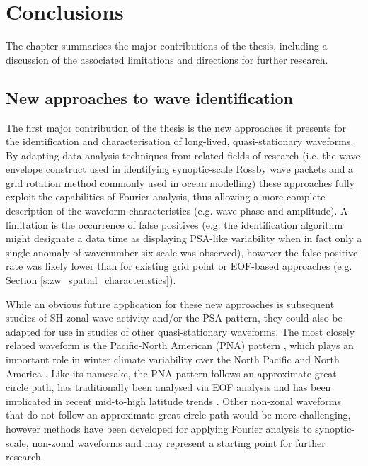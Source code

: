 
\chapter{Conclusions}


\begin{synopsis}

The chapter summarises the major contributions of the thesis, including a discussion of the associated limitations and directions for further research.

\end{synopsis}


\section{New approaches to wave identification}

The first major contribution of the thesis is the new approaches it presents for the identification and characterisation of long-lived, quasi-stationary waveforms. By adapting data analysis techniques from related fields of research (i.e. the wave envelope construct used in identifying synoptic-scale Rossby wave packets and a grid rotation method commonly used in ocean modelling) these approaches fully exploit the capabilities of Fourier analysis, thus allowing a more complete description of the waveform characteristics (e.g. wave phase and amplitude). A limitation is the occurrence of false positives (e.g. the identification algorithm might designate a data time as displaying PSA-like variability when in fact only a single anomaly of wavenumber six-scale was observed), however the false positive rate was likely lower than for existing grid point or EOF-based approaches (e.g. Section \ref{s:zw_spatial_characteristics}).

While an obvious future application for these new approaches is subsequent studies of SH zonal wave activity and/or the PSA pattern, they could also be adapted for use in studies of other quasi-stationary waveforms. The most closely related waveform is the Pacific-North American (PNA) pattern \citep{Wallace1981}, which plays an important role in winter climate variability over the North Pacific and North America \citep[e.g.][]{Notaro2006}. Like its namesake, the PNA pattern follows an approximate great circle path, has traditionally been analysed via EOF analysis and has been implicated in recent mid-to-high latitude trends \citep[e.g.][]{Ding2014,Liu2015}. Other non-zonal waveforms that do not follow an approximate great circle path would be more challenging, however methods have been developed for applying Fourier analysis to synoptic-scale, non-zonal waveforms \citep{Zimin2006,Souders2014} and may represent a starting point for further research. 

